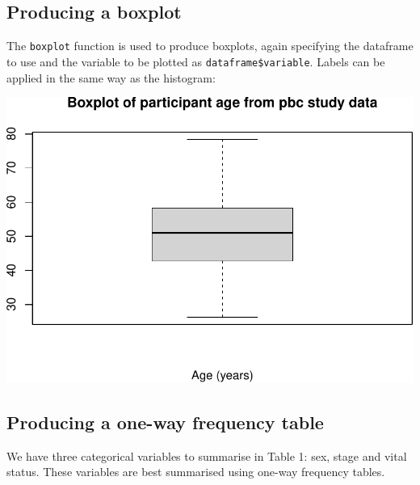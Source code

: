 \documentclass[
]{memoir}
\newenvironment{Shaded}{\begin{snugshade}}{\end{snugshade}}
\newcommand{\AttributeTok}[1]{\textcolor[rgb]{0.77,0.63,0.00}{#1}}
\newcommand{\FunctionTok}[1]{\textcolor[rgb]{0.00,0.00,0.00}{#1}}
\newcommand{\NormalTok}[1]{#1}
\newcommand{\SpecialCharTok}[1]{\textcolor[rgb]{0.00,0.00,0.00}{#1}}
\newcommand{\StringTok}[1]{\textcolor[rgb]{0.31,0.60,0.02}{#1}}
\begin{document}
\hypertarget{producing-a-boxplot}{%
\subsection{Producing a boxplot}\label{producing-a-boxplot}}

The \texttt{boxplot} function is used to produce boxplots, again specifying the dataframe to use and the variable to be plotted as \texttt{dataframe\$variable}. Labels can be applied in the same way as the histogram:

\begin{Shaded}
\end{Shaded}

\includegraphics{01-IntroToR_files/figure-latex/unnamed-chunk-30-1.pdf}

\hypertarget{producing-a-one-way-frequency-table}{%
\subsection{Producing a one-way frequency table}\label{producing-a-one-way-frequency-table}}

We have three categorical variables to summarise in Table 1: sex, stage and vital status. These variables are best summarised using one-way frequency tables.
\end{document}
